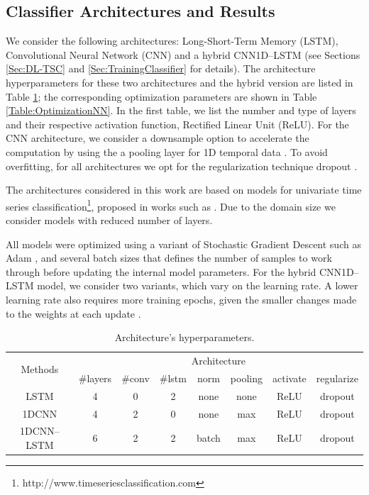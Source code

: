 \subsection{Classifier Architectures and Results}
\label{Sec:TSC_NN_Results}

We consider the following architectures: Long-Short-Term Memory (LSTM), Convolutional Neural Network (CNN) and a hybrid CNN1D--LSTM (see Sections \ref{Sec:DL-TSC} and \ref{Sec:TrainingClassifier} for details). The architecture hyperparameters for these two architectures and the hybrid version are listed in Table \ref{Table:HyperparametersNN}; the corresponding optimization parameters are shown in Table \ref{Table:OptimizationNN}. In the first table, we list the number and type of layers and their respective activation function, Rectified Linear Unit (ReLU). For the CNN architecture, we consider a downsample option to accelerate the computation by using the a pooling layer for 1D temporal data \cite{Gholamalinezhad2020}. To avoid overfitting, for all architectures we opt for the regularization technique dropout \cite{Srivastava2014, Baldi2013}. 

The architectures considered in this work are based on models for univariate time series classification\footnote{http://www.timeseriesclassification.com}, proposed in works such as \cite{Bagnall2017a, Fawaz2019}. Due to the domain size we consider models with reduced number of layers.

All models were optimized using a variant of Stochastic Gradient Descent such as Adam \cite{Kingma2015}, and several batch sizes that defines the number of samples to work through before updating the internal model parameters. For the hybrid CNN1D--LSTM model, we consider two variants, which vary on the learning rate. A lower learning rate also requires more training epochs, given the smaller changes made to the weights at each update \cite{Patterson2017}.

\begin{table}[h]
	\centering
	\small
	\begin{tabular}{|c|c|c|c|c|c|c|c|}
		\hline
		\multirow{2}{*}{Methods} & \multicolumn{7}{c|}{Architecture} \\
		\cline{2-8}
		& \#layers & \#conv & \#lstm & norm & pooling & activate & regularize \\
		\cline{2-8}
		\hline
		LSTM & 4 & 0 & 2 & none & none & ReLU & dropout \\
		\hline
		1DCNN & 4 & 2 & 0 & none & max & ReLU & dropout \\
		\hline
		1DCNN--LSTM & 6 & 2 & 2 & batch & max & ReLU & dropout  \\
		\hline
	\end{tabular}
	\caption{Architecture’s hyperparameters.}
	\label{Table:HyperparametersNN}
\end{table}

